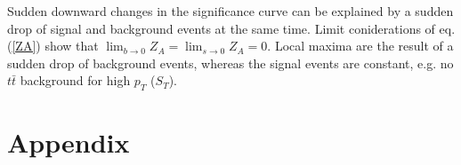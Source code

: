 %
Sudden downward changes in the significance curve can be explained by a sudden drop of signal and background events at the same time. Limit coniderations of eq. (\ref{ZA}) show that $\lim_{b\rightarrow 0}Z_A=\lim_{s\rightarrow 0}Z_A=0$. Local maxima are the result of a sudden drop of background events, whereas the signal events are constant, e.g. no $t\bar{t}$ background for high $p_T$ ($S_T$).  
\appendix
\chapter{Appendix}
